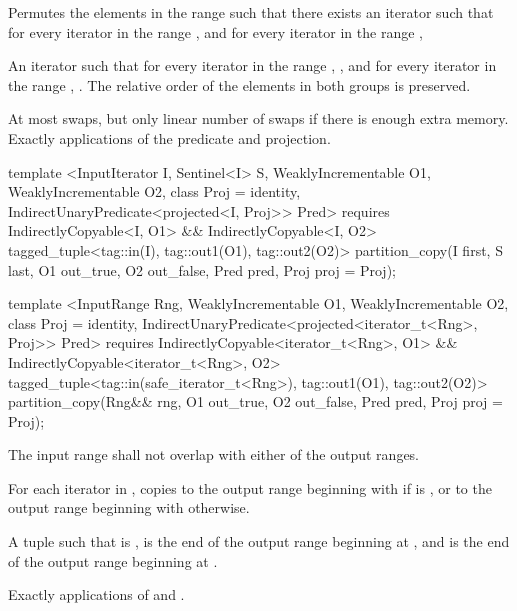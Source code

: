 \begin{itemdescr}
\pnum
\effects Permutes the elements in the range  such that there exists an iterator 
such that for every iterator  in the range 
, and for every iterator  in the
range , 

\pnum
\returns
An iterator
such that for every iterator
in the range
,
,
and for every iterator
in the range
,
.
The relative order of the elements in both groups is preserved.

\pnum
\complexity
At most
swaps, but only linear number of swaps if there is enough extra memory.
Exactly
applications of the predicate and projection.
\end{itemdescr}

%
\begin{itemdecl}
template <InputIterator I, Sentinel<I> S, WeaklyIncrementable O1, WeaklyIncrementable O2,
    class Proj = identity, IndirectUnaryPredicate<projected<I, Proj>> Pred>
  requires IndirectlyCopyable<I, O1> && IndirectlyCopyable<I, O2>
  tagged_tuple<tag::in(I), tag::out1(O1), tag::out2(O2)>
    partition_copy(I first, S last, O1 out_true, O2 out_false, Pred pred,
                   Proj proj = Proj{});

template <InputRange Rng, WeaklyIncrementable O1, WeaklyIncrementable O2,
    class Proj = identity,
    IndirectUnaryPredicate<projected<iterator_t<Rng>, Proj>> Pred>
  requires IndirectlyCopyable<iterator_t<Rng>, O1> &&
    IndirectlyCopyable<iterator_t<Rng>, O2>
  tagged_tuple<tag::in(safe_iterator_t<Rng>), tag::out1(O1), tag::out2(O2)>
    partition_copy(Rng&& rng, O1 out_true, O2 out_false, Pred pred, Proj proj = Proj{});
\end{itemdecl}

\begin{itemdescr}
\pnum
\requires The input range shall not overlap with
either of the output ranges.

\pnum
\effects For each iterator  in , copies  to the output range
beginning with  if
 is , or to
the output range beginning with  otherwise.

\pnum
\returns A tuple  such that  is ,
 is the end of the output range beginning at ,
and  is the end of the output range beginning at .

\pnum
\complexity Exactly  applications of  and .
\end{itemdescr}

